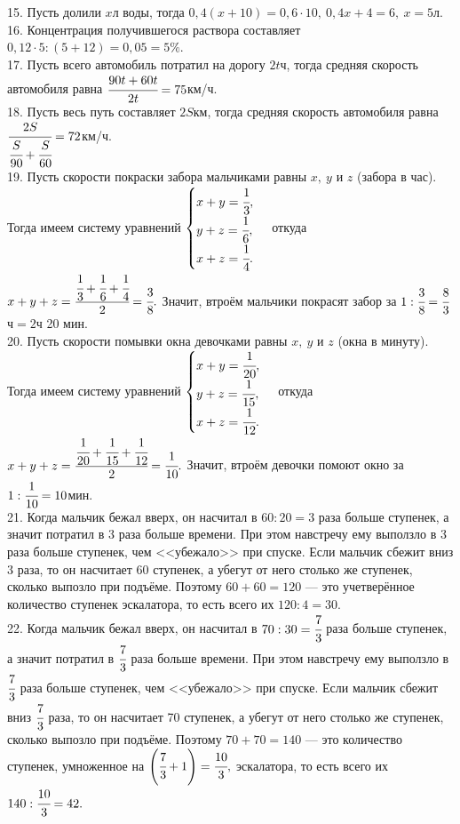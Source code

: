 \documentclass[12pt]{article}
\begin{document}
15. Пусть долили $x$л воды, тогда $0,4(x+10)=0,6\cdot10,\ 0,4x+4=6,\ x=5$л.\\
16. Концентрация получившегося раствора составляет $0,12\cdot5:(5+12)=0,05=5\%.$\\
17. Пусть всего автомобиль потратил на дорогу $2t$ч, тогда средняя скорость автомобиля равна $\cfrac{90t+60t}{2t}=75$км/ч.\\
18. Пусть весь путь составляет $2S$км, тогда средняя скорость автомобиля равна $\cfrac{2S}{\cfrac{S}{90}+\cfrac{S}{60}}=72$км/ч.\\
19. Пусть скорости покраски забора мальчиками равны $x,\ y$ и $z$ (забора в час). Тогда имеем систему уравнений $\begin{cases} x+y=\cfrac{1}{3},\\ y+z=\cfrac{1}{6},\\ x+z=\cfrac{1}{4}.\end{cases}$ откуда $x+y+z=\cfrac{\cfrac{1}{3}+\cfrac{1}{6}+\cfrac{1}{4}}{2}=\cfrac{3}{8}.$ Значит, втроём мальчики покрасят забор за $1:\cfrac{3}{8}=\cfrac{8}{3}$ч$=2$ч 20 мин.\\
20. Пусть скорости помывки окна девочками равны $x,\ y$ и $z$ (окна в минуту). Тогда имеем систему уравнений $\begin{cases} x+y=\cfrac{1}{20},\\ y+z=\cfrac{1}{15},\\ x+z=\cfrac{1}{12}.\end{cases}$ откуда $x+y+z=\cfrac{\cfrac{1}{20}+\cfrac{1}{15}+\cfrac{1}{12}}{2}=\cfrac{1}{10}.$ Значит, втроём девочки помоют окно за $1:\cfrac{1}{10}=10$мин.\\
21. Когда мальчик бежал вверх, он насчитал в $60:20=3$ раза больше ступенек, а значит потратил в 3 раза больше времени. При этом навстречу ему выползло в 3 раза больше ступенек, чем <<убежало>> при спуске. Если мальчик сбежит вниз 3 раза, то он насчитает 60 ступенек, а убегут от него столько же ступенек, сколько выпозло при подъёме. Поэтому $60+60=120$ --- это учетверённое количество ступенек эскалатора, то есть всего их $120:4=30.$\\
22. Когда мальчик бежал вверх, он насчитал в $70:30=\cfrac{7}{3}$ раза больше ступенек, а значит потратил в $\cfrac{7}{3}$ раза больше времени. При этом навстречу ему выползло в $\cfrac{7}{3}$ раза больше ступенек, чем <<убежало>> при спуске. Если мальчик сбежит вниз $\cfrac{7}{3}$ раза, то он насчитает 70 ступенек, а убегут от него столько же ступенек, сколько выпозло при подъёме. Поэтому $70+70=140$ --- это количество ступенек, умноженное на $\left(\cfrac{7}{3}+1\right)=\cfrac{10}{3},$ эскалатора, то есть всего их $140:\cfrac{10}{3}=42.$\\
\end{document}
